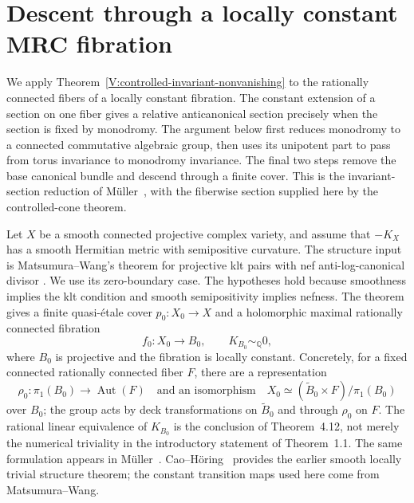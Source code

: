 \section{Descent through a locally constant MRC fibration}
\label{V:sec-mrc-descent}

We apply Theorem~\ref{V:controlled-invariant-nonvanishing} to the
rationally connected fibers of a locally constant fibration.  The constant extension of a section
on one fiber gives a relative anticanonical section precisely when
the section is fixed by monodromy.  The argument below first reduces monodromy to
a connected commutative algebraic group, then uses its unipotent part
to pass from torus invariance to monodromy invariance.  The final two
steps remove the base canonical bundle and descend through a finite
cover.  This is the invariant-section reduction of
M\"uller~\cite[Theorem~2.2 and its proof]{Muller2025}, with the
fiberwise section supplied here by the controlled-cone theorem.

Let $X$ be a smooth connected projective complex variety, and assume
that $-K_X$ has a smooth Hermitian metric with semipositive curvature.
The structure input is Matsumura--Wang's theorem for projective klt
pairs with nef anti-log-canonical divisor
\cite[Theorem~1.1, Definition~2.3, Theorem~4.12, and the conclusion
of~\S4.4]{MatsumuraWangV3}.  We use its zero-boundary case.  The
hypotheses hold because smoothness implies the klt condition and
smooth semipositivity implies nefness.  The theorem gives a finite
quasi-\'etale cover $p_0:X_0\to X$ and a holomorphic maximal
rationally connected fibration
\[
 f_0:X_0\longrightarrow B_0,
 \qquad K_{B_0}\sim_{\mathbb Q}0,
\]
where $B_0$ is projective and the fibration is locally constant.
Concretely, for a fixed connected rationally connected fiber $F$, there
are a representation
\[
 \rho_0:\pi_1(B_0)\longrightarrow\operatorname{Aut}(F)
 \quad\text{and an isomorphism}\quad
 X_0\simeq(\widetilde B_0\times F)/\pi_1(B_0)
\]
over $B_0$; the group acts by deck transformations on $\widetilde B_0$
and through $\rho_0$ on $F$.  The rational linear equivalence of
$K_{B_0}$ is the conclusion of Theorem~4.12, not merely the numerical
triviality in the introductory statement of Theorem~1.1.  The same
formulation appears in M\"uller~\cite[Theorem~2.1]{Muller2025}.
Cao--H\"oring~\cite{CaoHoring}
provides the earlier smooth locally trivial structure theorem; the
constant transition maps used here come from Matsumura--Wang.

